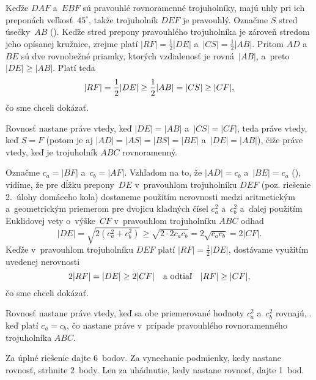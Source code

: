 {%
Keďže $DAF$ a~$EBF$ sú pravouhlé rovnoramenné trojuholníky, majú uhly pri ich
preponách veľkosť~$45^{\circ}$, takže trojuholník $DEF$ je pravouhlý.
Označme $S$ stred úsečky~$AB$ (\obr). Keďže
stred prepony pravouhlého trojuholníka je zároveň stredom jeho opísanej
kružnice, zrejme platí $|RF|=\frac12|DE|$ a~$|CS|=\frac12|AB|$.
Pritom $AD$ a~$BE$ sú dve rovnobežné priamky, ktorých vzdialenosť je rovná~$|AB|$,
a~preto $|DE|\ge|AB|$. Platí teda
$$
\postdisplaypenalty10000
|RF|=\frac12|DE|\ge\frac12|AB|=|CS|\ge |CF|,
$$
čo sme chceli dokázať.
%

Rovnosť nastane práve vtedy, keď $|DE|=|AB|$ a~$|CS|=|CF|$, teda práve vtedy, keď $S=F$
(potom je aj $|AD|=|AS|=|BS|=|BE|$ a~$|DE|=|AB|$), čiže práve vtedy, keď je trojuholník $ABC$ rovnoramenný.

\ineriesenie
Označme $c_a=|BF|$ a~$c_b=|AF|$. Vzhľadom na to, že $|AD|=c_b$
a~$|BE|=c_a$ (), vidíme, že pre dĺžku prepony~$DE$ v~pravouhlom
trojuholníku $DEF$ (poz. riešenie 2.~úlohy domáceho kola) dostaneme použitím
nerovnosti medzi aritmetickým a~geometrickým priemerom pre dvojicu kladných
čísel $c_a^2$ a~$c_b^2$ a~ďalej použitím Euklidovej vety o~výške~$CF$ v~pravouhlom
trojuholníku $ABC$ odhad
$$
|DE|%
    =\sqrt{2(c_a^2+c_b^2)}\geq
\sqrt{2\cdot 2c_ac_b}=2\sqrt{c_ac_b}=2|CF|.
$$
Keďže v~pravouhlom trojuholníku $DEF$ platí $|RF|=\frac12|DE|$,
dostávame využitím uvedenej nerovnosti
$$
2|RF|=|DE|\ge 2|CF| \quad \hbox{a odtiaľ} \quad |RF|\geq |CF|,
$$
čo sme chceli dokázať.

Rovnosť nastane práve vtedy, keď sa obe priemerované hodnoty $c_a^2$ a~$c_b^2$ rovnajú, \tj. keď
platí $c_a=c_b$, čo nastane práve v~prípade pravouhlého rovnoramenného trojuholníka $ABC$.


\nobreak\medskip\petit\noindent
Za úplné riešenie dajte 6~bodov.
Za vynechanie podmienky, kedy nastane rovnosť, strhnite 2~body. Len za uhádnutie, kedy nastane rovnosť, dajte 1~bod.
\endpetit
\bigbreak
}

